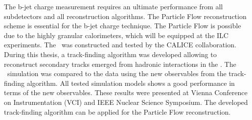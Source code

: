 The b-jet charge measurement requires an ultimate performance from all subdetectors and all reconstruction algorithms. The Particle Flow reconstruction scheme is essential for the b-jet charge technique.
The Particle Flow is possible due to the highly granular calorimeters, which will be equipped at the ILC experiments. 
The \ecalp\ was constructed and tested by the CALICE collaboration. 
During this thesis, a track-finding algorithm was developed allowing to reconstruct secondary tracks emerged from hadronic interactions in the \ecalp.
The \ecalp\ simulation was compared to the data using the new observables from the track-finding algorithm. 
All tested simulation models shows a good performance in terms of the new observables. 
These results were presented at Vienna Conference on Instrumentation (VCI) and IEEE Nuclear Science Symposium.
The developed track-finding algorithm can be applied for the Particle Flow reconstruction. 